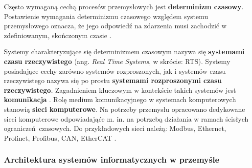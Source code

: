 \documentclass[a4paper, 12pt, twoside]{article}
\begin{document}
Często wymaganą cechą procesów przemysłowych jest \textbf{determinizm czasowy}.
Postawienie wymagania determinizmu czasowego względem systemu przemysłowego oznacza,
że jego odpowiedź na zdarzenia musi zachodzić w zdefiniowanym, skończonym czasie
\cite{isp}.

Systemy charakteryzujące się determinizmem czasowym nazywa się 
\textbf{systemami czasu rzeczywistego} (ang. \emph{Real Time Systems}, w skrócie: RTS). 
Systemy posiadające cechy zarówno systemów rozproszonych, jak i systemów
czasu rzeczywistego nazywa się po prostu \textbf{systemami rozproszonymi czasu rzeczywistego}.
Zagadnieniem kluczowym w kontekście takich systemów
jest \textbf{komunikacja} \cite{isp-analiza-przepływu-informacji}.
Rolę medium komunikacyjnego
w systemach komputerowych stanowią \textbf{sieci komputerowe}. Na potrzeby 
przemysłu opracowano dedykowane sieci komputerowe odpowiadająće m. in. na potrzebą
działania w ramach ścisłych ograniczeń czasowych. Do przykładowych sieci należą:
Modbus, Ethernet, Profinet, Profibus, CAN, EtherCAT \cite{systemy-automatyki-przemyslowej}.

\subsubsection{Architektura systemów informatycznych w przemyśle}
\end{document}
